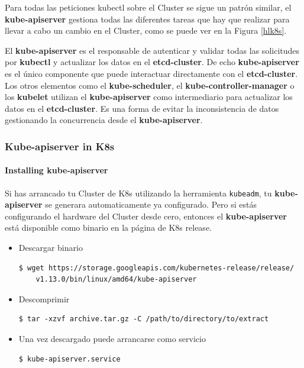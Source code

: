 \documentclass{article}
\newenvironment{blocktemplateII}[1]{%
    \tcolorbox[beamer,%
    noparskip,breakable,
    colframe=Green,%
    colbacklower=LimeGreen!75!LightGreen,%
    title=#1]}%
    {\endtcolorbox}
\newenvironment{codetemplate}[1][]{%
  \mybasecolorbox[#1]
  \itshape
}{%
  \endmybasecolorbox
}
\begin{document}
Para todas las peticiones kubectl sobre el Cluster se sigue un patrón similar, el \textbf{kube-apiserver} gestiona todas las diferentes tareas que hay que realizar para llevar a cabo un cambio en el Cluster, como se puede ver en la Figura \ref{hlk8s}.



\begin{blocktemplateII}{Note}
El \textbf{kube-apiserver} es el responsable de autenticar y validar todas las solicitudes por \textbf{kubectl} y actualizar los datos en el \textbf{etcd-cluster}. De echo \textbf{kube-apiserver} es el único componente que puede interactuar directamente con el \textbf{etcd-cluster}. Los otros elementos como el \textbf{kube-scheduler}, el \textbf{kube-controller-manager} o los \textbf{kubelet} utilizan el \textbf{kube-apiserver} como intermediario para actualizar los datos en el \textbf{etcd-cluster}. Es una forma de evitar la inconsistencia de datos gestionando la concurrencia desde el \textbf{kube-apiserver}.
\end{blocktemplateII}


\subsubsection{Kube-apiserver in K8s}

\paragraph{Installing kube-apiserver}

Si has arrancado tu Cluster de K8s utilizando la herramienta \verb|kubeadm|, tu \textbf{kube-apiserver} se generara automaticamente ya configurado. Pero si estás configurando el hardware del Cluster desde cero, entonces el \textbf{kube-apiserver} está disponible como binario en la página de K8s release.

\begin{itemize}
    \item Descargar binario
\begin{codetemplate}{}
\begin{verbatim}
$ wget https://storage.googleapis.com/kubernetes-release/release/
    v1.13.0/bin/linux/amd64/kube-apiserver
\end{verbatim}
\end{codetemplate}

    \item Descomprimir
\begin{codetemplate}{}
\begin{verbatim}
$ tar -xzvf archive.tar.gz -C /path/to/directory/to/extract
\end{verbatim}
\end{codetemplate} 

    \item Una vez descargado puede arrancarse como servicio
\begin{codetemplate}{}
\begin{verbatim}
$ kube-apiserver.service
\end{verbatim}
\end{codetemplate}
\end{itemize}
\end{document}
